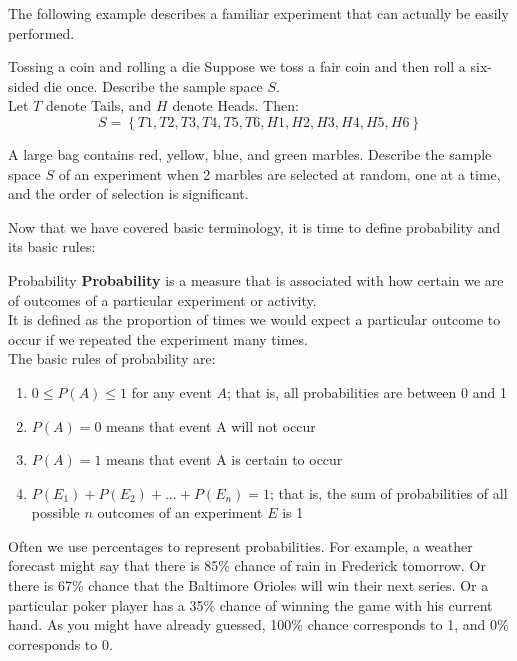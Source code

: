 The following example describes a familiar experiment that can actually be easily performed.

\begin{example}[https://www.youtube.com/watch?v=hD3-sONaoHk]{Tossing a coin and rolling a die}
Suppose we toss a fair coin and then roll a six-sided die once. Describe the sample space $S$. \\

 Let $T$ denote Tails, and $H$ denote Heads. Then:
\[  S = \left\{T 1, T 2, T 3, T 4, T 5, T 6, H 1, H 2, H 3, H 4, H 5, H 6 \right\} \]
\end{example}

\begin{try}
A large bag contains red, yellow, blue, and green marbles. Describe the sample space $S$ of an experiment when 2 marbles are selected at random, one at a time, and the order of selection is significant.
\end{try}
\vfill
\pagebreak

Now that we have covered basic terminology, it is time to define probability and its basic rules:
\begin{proc}{Probability}
\textbf{Probability} is a measure that is associated with how certain we are of outcomes of a particular experiment or activity. \\ 

It is defined as the proportion of times we would expect a particular outcome to occur if we repeated the experiment many times.\\

The basic rules of probability are:
\begin{enumerate}
	\item $0 \leq P(A) \leq 1$ for any event $A$; that is, all probabilities are between 0 and 1
	\item $P(A) = 0$ means that event A will not occur
	\item $P(A) = 1$ means that event A is certain to occur
	\item $P(E_1) + P(E_2) + \dots + P(E_n) = 1 $; that is, the sum of probabilities of all possible $n$ outcomes of an experiment $E$ is 1
\end{enumerate}
\end{proc}

Often we use percentages to represent probabilities. For example, a weather forecast might say that there is 85\% chance of rain in Frederick tomorrow. Or there is 67\% chance that the Baltimore Orioles will win their next series. Or a particular poker player has a 35\% chance of winning the game with his current hand. As you might have already guessed, 100\% chance corresponds to 1, and 0\% corresponds to 0.

